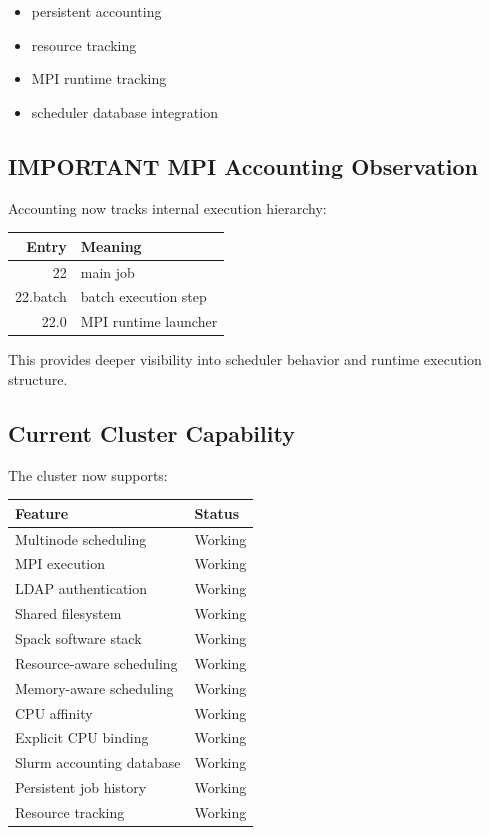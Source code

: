 \documentclass[11pt]{article}
\begin{document}
\begin{itemize}
\item persistent accounting
\item resource tracking
\item MPI runtime tracking
\item scheduler database integration
\end{itemize}
\subsection{IMPORTANT MPI Accounting Observation}
\label{sec:org42fdb82}

Accounting now tracks internal execution hierarchy:

\begin{center}
\begin{tabular}{rl}
Entry & Meaning\\
\hline
22 & main job\\
22.batch & batch execution step\\
22.0 & MPI runtime launcher\\
\end{tabular}
\end{center}

This provides deeper visibility into scheduler behavior and runtime
execution structure.
\subsection{Current Cluster Capability}
\label{sec:org4b7b281}

The cluster now supports:

\begin{center}
\begin{tabular}{ll}
Feature & Status\\
\hline
Multinode scheduling & Working\\
MPI execution & Working\\
LDAP authentication & Working\\
Shared filesystem & Working\\
Spack software stack & Working\\
Resource-aware scheduling & Working\\
Memory-aware scheduling & Working\\
CPU affinity & Working\\
Explicit CPU binding & Working\\
Slurm accounting database & Working\\
Persistent job history & Working\\
Resource tracking & Working\\
\end{tabular}
\end{center}
\end{document}
